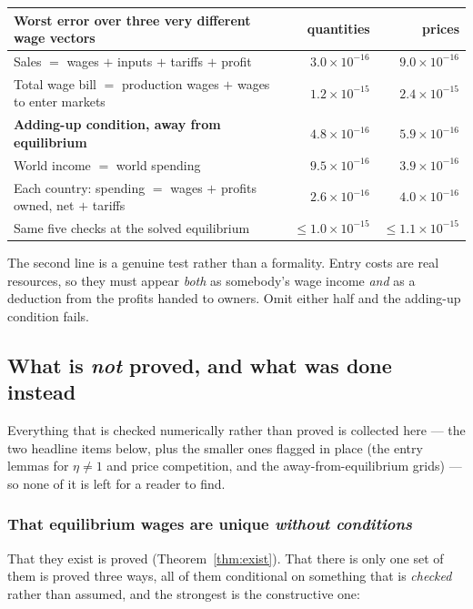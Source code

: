 \documentclass[11pt]{article}
\theoremstyle{plain}
\theoremstyle{remark}
\theoremstyle{definition}
\begin{document}
\begin{center}
\begin{tabular}{lrr}
\toprule
Worst error over three very different wage vectors & quantities & prices\\
\midrule
Sales $=$ wages $+$ inputs $+$ tariffs $+$ profit & $3.0\times10^{-16}$ & $9.0\times10^{-16}$\\
Total wage bill $=$ production wages $+$ wages to enter markets & $1.2\times10^{-15}$ & $2.4\times10^{-15}$\\
\textbf{Adding-up condition, away from equilibrium} & $4.8\times10^{-16}$ & $5.9\times10^{-16}$\\
World income $=$ world spending & $9.5\times10^{-16}$ & $3.9\times10^{-16}$\\
Each country: spending $=$ wages $+$ profits owned, net $+$ tariffs & $2.6\times10^{-16}$ & $4.0\times10^{-16}$\\
\midrule
Same five checks at the solved equilibrium & $\le1.0\times10^{-15}$ & $\le1.1\times10^{-15}$\\
\bottomrule
\end{tabular}
\end{center}

\noindent The second line is a genuine test rather than a formality. Entry costs are
real resources, so they must appear \emph{both} as somebody's wage income \emph{and} as
a deduction from the profits handed to owners. Omit either half and the adding-up
condition fails.

\subsection{What is \emph{not} proved, and what was done instead}
\label{sec:notproved}

Everything that is checked numerically rather than proved is collected here --- the
two headline items below, plus the smaller ones flagged in place (the entry lemmas
for $\eta\neq1$ and price competition, and the away-from-equilibrium grids) --- so
none of it is left for a reader to find.

\subsubsection{That equilibrium wages are unique \emph{without conditions}}

That they exist is proved (Theorem~\ref{thm:exist}). That there is only one set of them
is proved three ways, all of them conditional on something that is \emph{checked} rather
than assumed, and the strongest is the constructive one:
\end{document}
